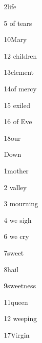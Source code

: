 \item{2}{life} 
\item{5}{	of tears} 
\item{10}{Mary} 
\item{12}{	children} 
\item{13}{clement} 
\item{14}{of mercy} 
\item{15}{	exiled} 
\item{16}{	of Eve} 
\item{18}{our} 

\noindent Down 

\item{1}{mother} 
\item{2}{	valley} 
\item{3}{	mourning} 
\item{4}{	we sigh} 
\item{6}{	we cry} 
\item{7}{sweet} 
\item{8}{hail} 
\item{9}{sweetness} 
\item{11}{queen} 
\item{12}{	weeping} 
\item{17}{Virgin} 
\bye